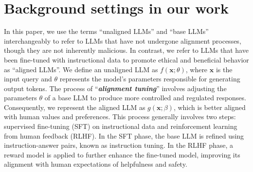 \section{Background settings in our work}
\label{append:background}
In this paper, we use the terms “unaligned LLMs” and “base LLMs” interchangeably to refer to LLMs that have not undergone alignment processes, though they are not inherently malicious. In contrast, we refer to LLMs that have been fine-tuned with instructional data to promote ethical and beneficial behavior as “aligned LLMs”.
%
We define an unaligned LLM as $f(\mathbf{x}; \theta)$, where $\mathbf{x}$ is the input query and $\theta$ represents the model’s parameters responsible for generating output tokens. 
%
The process of ``\textit{\textbf{alignment tuning}}'' involves adjusting the parameters $\theta$ of a base LLM to produce more controlled and regulated responses. 
Consequently, we represent the aligned LLM as $g(\mathbf{x}; \beta)$, which is better aligned with human values and preferences.
%
This process generally involves two steps: supervised fine-tuning (SFT) on instructional data and reinforcement learning from human feedback (RLHF). 
%
In the SFT phase, the base LLM is refined using instruction-answer pairs, known as instruction tuning. In the RLHF phase, a reward model is applied to further enhance the fine-tuned model, improving its alignment with human expectations of helpfulness and safety.